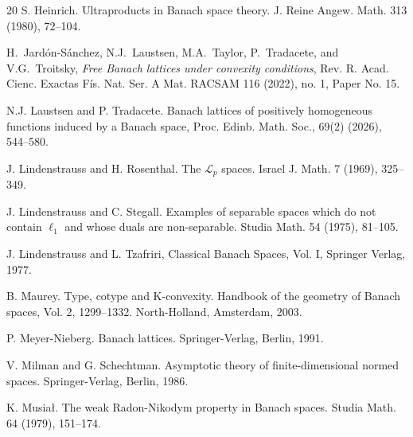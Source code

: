 \documentclass{amsart}
\theoremstyle{plain}
\theoremstyle{definition}
\numberwithin{equation}{section}
\begin{document}
\begin{thebibliography}{20}
 S. Heinrich. Ultraproducts in Banach space theory.
J. Reine Angew. Math. 313 (1980), 72--104.


H.~Jard\'on-S\'anchez, N.J.~Laustsen, M.A.~Taylor, P.~Tradacete, and V.G.~Troitsky, \emph{Free Banach lattices under convexity conditions},  Rev. R. Acad. Cienc. Exactas F\'is. Nat. Ser. A Mat. RACSAM 116 (2022), no. 1, Paper No. 15.


 N.J. Laustsen and P. Tradacete. Banach lattices of positively homogeneous functions induced by a Banach space, Proc. Edinb. Math. Soc., 69(2) (2026), 544–580.

 J. Lindenstrauss and H. Rosenthal. The ${\mathcal L}_p$ spaces.
Israel J. Math. 7 (1969), 325--349.


 J. Lindenstrauss and C. Stegall. Examples of separable spaces which do not contain $\ell_1$ and whose duals are non-separable.
Studia Math.   54 (1975), 81--105.

 J. Lindenstrauss and L. Tzafriri, Classical Banach Spaces, Vol. I, Springer Verlag, 1977.



 B. Maurey. 
Type, cotype and K-convexity. Handbook of the geometry of Banach spaces, Vol. 2, 1299--1332.
North-Holland, Amsterdam, 2003.

 P. Meyer-Nieberg. Banach lattices. Springer-Verlag, Berlin, 1991.

 V. Milman and G. Schechtman.
Asymptotic theory of finite-dimensional normed spaces. 
Springer-Verlag, Berlin, 1986. 

 K. Musia\l{}. The weak Radon-Nikodym property in Banach spaces. Studia Math. 64 (1979), 151--174.


\end{thebibliography}
\end{document}
